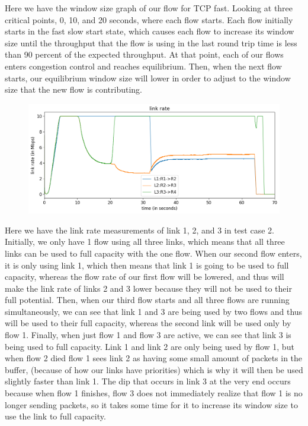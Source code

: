 \documentclass{article}
\begin{document}
Here we have the window size graph of our flow for TCP fast. Looking at three critical points, 0, 10, and 20 seconds, where each flow starts. Each flow initially starts in the fast slow start state, which causes each flow to increase its window size until the throughput that the flow is using in the last round trip time is less than 90 percent of the expected throughput. At that point, each of our flows enters congestion control and reaches equilibrium. Then, when the next flow starts, our equilibrium window size will lower in order to adjust to the window size that the new flow is contributing.

\begin{figure}[H]
\centering
\includegraphics[width = \textwidth]{test_case2_fast link rate.png}
\end{figure}

Here we have the link rate measurements of link 1, 2, and 3 in test case 2. Initially, we only have 1 flow using all three links, which means that all three links can be used to full capacity with the one flow. When our second flow enters, it is only using link 1, which then means that link 1 is going to be used to full capacity, whereas the flow rate of our first flow will be lowered, and thus will make the link rate of links 2 and 3 lower because they will not be used to their full potential. Then, when our third flow starts and all three flows are running simultaneously, we can see that link 1 and 3 are being used by two flows and thus will be used to their full capacity, whereas the second link will be used only by flow 1. Finally, when just flow 1 and flow 3 are active, we can see that link 3 is being used to full capacity. Link 1 and link 2 are only being used by flow 1, but when flow 2 died flow 1 sees link 2 as having some small amount of packets in the buffer, (because of how our links have priorities) which is why it will then be used slightly faster than link 1. The dip that occurs in link 3 at the very end occurs because when flow 1 finishes, flow 3 does not immediately realize that flow 1 is no longer sending packets, so it takes some time for it to increase its window size to use the link to full capacity.
\end{document}
